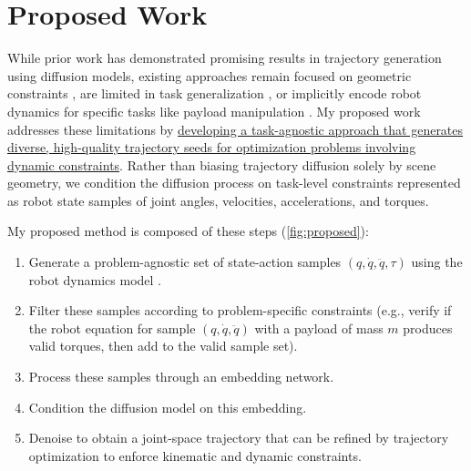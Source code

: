 

\section{Proposed Work}



While prior work has demonstrated promising results in trajectory generation using diffusion models, existing approaches remain focused on geometric constraints \cite{sundaralingam2023curobo,seo2024presto}, are limited in task generalization \cite{ichnowski2020deep}, or implicitly encode robot dynamics for specific tasks like payload manipulation \cite{pasricha2025payload}.
My proposed work addresses these limitations by \ul{developing a task-agnostic approach that generates diverse, high-quality trajectory seeds for optimization problems involving dynamic constraints}.
Rather than biasing trajectory diffusion solely by scene geometry, we condition the diffusion process on task-level constraints represented as robot state samples of joint angles, velocities, accelerations, and torques.

My proposed method is composed of these steps (\cref{fig:proposed}):
\begin{enumerate}
    \item Generate a problem-agnostic set of state-action samples $(q, \dot{q}, \ddot{q}, \tau)$ using the robot dynamics model \cite{Gaz2019}.
    \item Filter these samples according to problem-specific constraints (e.g., verify if the robot equation for sample $(q, \dot{q}, \ddot{q})$ with a payload of mass $m$ produces valid torques, then add to the valid sample set).
    \item Process these samples through an embedding network.
    \item Condition the diffusion model on this embedding.
    \item Denoise to obtain a joint-space trajectory that can be refined by trajectory optimization to enforce kinematic and dynamic constraints.
\end{enumerate}

